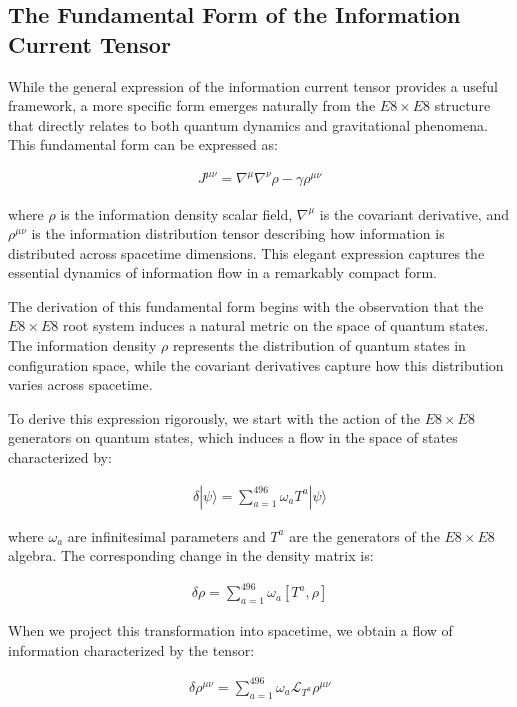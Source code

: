 \documentclass[11pt,english,twoside]{article}
\begin{document}
\subsection{The Fundamental Form of the Information Current Tensor}

While the general expression of the information current tensor provides a useful framework, a more specific form emerges naturally from the $E8\times E8$ structure that directly relates to both quantum dynamics and gravitational phenomena. This fundamental form can be expressed as:

\begin{align}
    J^{\mu\nu} = \nabla^{\mu}\nabla^{\nu}\rho - \gamma\rho^{\mu\nu}
\end{align}

where $\rho$ is the information density scalar field, $\nabla^{\mu}$ is the covariant derivative, and $\rho^{\mu\nu}$ is the information distribution tensor describing how information is distributed across spacetime dimensions. This elegant expression captures the essential dynamics of information flow in a remarkably compact form.

The derivation of this fundamental form begins with the observation that the $E8\times E8$ root system induces a natural metric on the space of quantum states. The information density $\rho$ represents the distribution of quantum states in configuration space, while the covariant derivatives capture how this distribution varies across spacetime.

To derive this expression rigorously, we start with the action of the $E8\times E8$ generators on quantum states, which induces a flow in the space of states characterized by:

\begin{align}
    \delta|\psi\rangle = \sum_{a=1}^{496} \omega_a T^a |\psi\rangle
\end{align}

where $\omega_a$ are infinitesimal parameters and $T^a$ are the generators of the $E8\times E8$ algebra. The corresponding change in the density matrix is:

\begin{align}
    \delta\rho = \sum_{a=1}^{496} \omega_a [T^a, \rho]
\end{align}

When we project this transformation into spacetime, we obtain a flow of information characterized by the tensor:

\begin{align}
    \delta\rho^{\mu\nu} = \sum_{a=1}^{496} \omega_a \mathcal{L}_{T^a}\rho^{\mu\nu}
\end{align}
\end{document}
